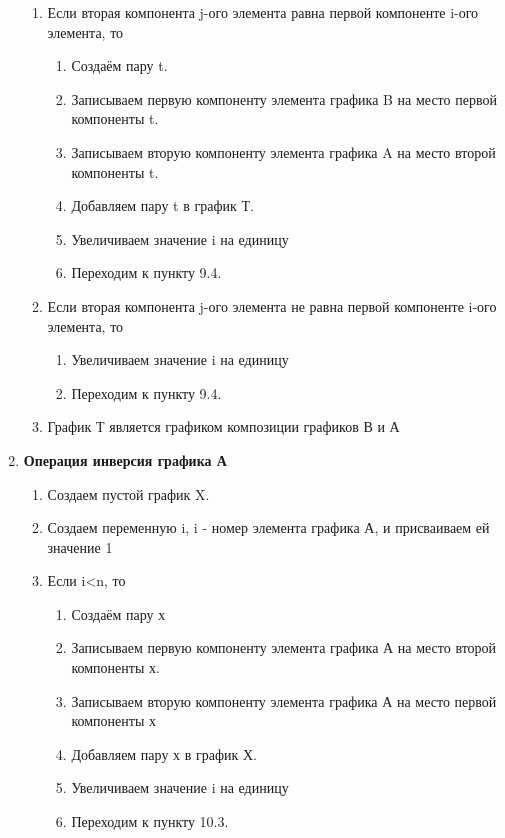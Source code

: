 \documentclass[a4paper,12pt]{extarticle}
\begin{document}
\begin{enumerate}
\begin{enumerate}[label*=\arabic*.]
        \item Если вторая компонента j-ого элемента равна первой компоненте i-ого элемента, то
        \begin{enumerate}[label*=\arabic*.]
            \item Создаём пару t.
            \item Записываем первую компоненту элемента графика B на место первой компоненты t.
            \item Записываем вторую компоненту элемента графика A на место второй компоненты t.
            \item Добавляем пару t в график Т.
            \item Увеличиваем значение i на единицу
            \item Переходим к пункту 9.4.
        \end{enumerate}
        \item Если вторая компонента j-ого элемента не равна первой компоненте i-ого элемента, то
        \begin{enumerate}[label*=\arabic*.]
            \item Увеличиваем значение i на единицу
            \item Переходим к пункту 9.4.
        \end{enumerate}
        \item График Т является графиком композиции графиков В и А
    \end{enumerate}
  \item \textbf{Операция инверсия графика А}
    \begin{enumerate}[label*=\arabic*.]
        \item Создаем пустой график X.
        \item Создаем переменную i, i - номер элемента графика А, и присваиваем ей значение 1
        \item Если i<n, то
        \begin{enumerate}[label*=\arabic*.]
            \item Создаём пару х
            \item Записываем первую компоненту элемента графика А на место второй компоненты х.
            \item Записываем вторую компоненту элемента графика А на место первой компоненты х
            \item Добавляем пару х в график Х.
            \item Увеличиваем значение i на единицу
            \item Переходим к пункту 10.3.

\end{enumerate}
\end{enumerate}
\end{enumerate}
\end{document}
